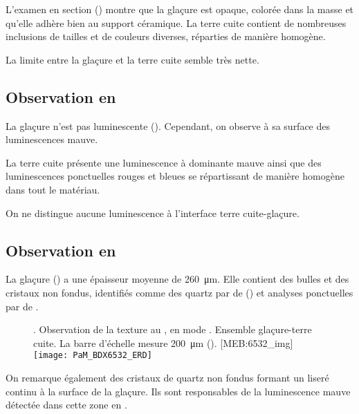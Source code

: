 L'examen en section () montre que la 
glaçure est opaque, colorée dans la masse et qu'elle adhère bien au 
support céramique. La terre cuite contient de nombreuses inclusions 
de tailles et de couleurs diverses, réparties de manière homogène.

La limite entre la glaçure et la terre cuite semble très nette.

\subsection{Observation en \CL}

La glaçure n'est pas luminescente (). 
Cependant, on observe à sa surface des luminescences mauve.

La terre cuite présente une luminescence à dominante mauve ainsi que 
des luminescences ponctuelles rouges et bleues se répartissant de 
manière homogène dans tout le matériau.

On ne distingue aucune luminescence à l'interface terre cuite-glaçure.

\subsection{Observation en \MEB[ie]}
La glaçure () a une épaisseur moyenne de 
\SI{260}{\um}. Elle contient des bulles et des cristaux non fondus, 
identifiés comme des quartz par \carto de \RX 
() et analyses ponctuelles par \spectro 
de \RX.

\begin{figure}[htb]
  \setlength{\imgwidth}{7cm}
  \setlength{\mylength}{1cm+\imgwidth}
  \setlength{\sidecapwidth}{\linewidth-\sidecapsep-\mylength-1cm}
  \renewcommand*{\sidecapfloatwidth}{\mylength}%
  \RaggedLeft
  \begin{sidecaption}{%
    \legendeE.
    Observation de la texture au \MEB, en mode \ERD. 
    Ensemble glaçure-terre cuite. La barre d'échelle mesure 
    \SI{200}{\um} ().%
  }[MEB:6532_img]
    \texttt{[image: PaM\_BDX6532\_ERD]}%
  \end{sidecaption}
\end{figure}

On remarque également des cristaux de quartz non fondus formant un 
liseré continu à la surface de la glaçure. Ils sont responsables de 
la luminescence mauve détectée dans cette zone en \CL.

